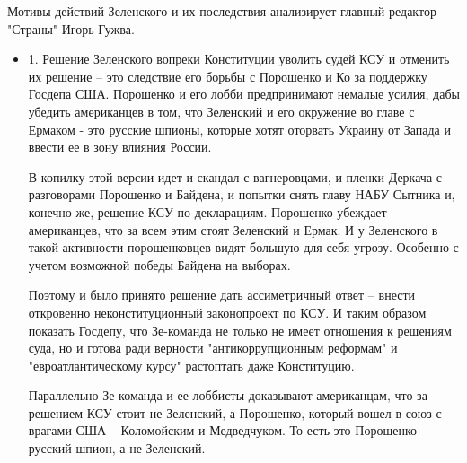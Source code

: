 Мотивы действий Зеленского и их последствия анализирует главный редактор
"Страны" Игорь Гужва.

\begin{itemize}
	
\item 1. Решение Зеленского вопреки Конституции уволить судей КСУ и отменить их
				решение – это следствие его борьбы с Порошенко и Ко за поддержку
				Госдепа США.  Порошенко и его лобби предпринимают немалые усилия, дабы
				убедить американцев в том, что Зеленский и его окружение во главе с
				Ермаком - это русские шпионы, которые хотят оторвать Украину от Запада
				и ввести ее в зону влияния России.

В копилку этой версии идет и скандал с вагнеровцами, и пленки Деркача с
разговорами Порошенко и Байдена, и попытки снять главу НАБУ Сытника и, конечно
же, решение КСУ по декларациям. Порошенко убеждает американцев, что за всем
этим стоят Зеленский и Ермак. И у Зеленского в такой активности порошенковцев
видят большую для себя угрозу. Особенно с учетом возможной победы Байдена на
выборах.

Поэтому и было принято решение дать ассиметричный ответ – внести откровенно
неконституционный законопроект по КСУ. И таким образом показать Госдепу, что
Зе-команда не только не имеет отношения к решениям суда, но и готова ради
верности "антикоррупционным реформам" и "евроатлантическому курсу" растоптать
даже Конституцию.

Параллельно Зе-команда и ее лоббисты доказывают американцам, что за решением
КСУ стоит не Зеленский, а Порошенко, который вошел в союз с врагами США –
Коломойским и Медведчуком. То есть это Порошенко русский шпион, а не Зеленский.


\end{itemize}
